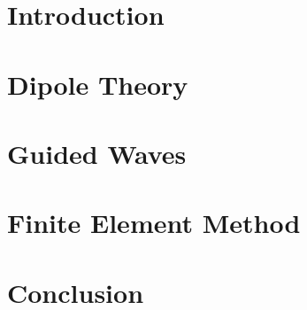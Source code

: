 \documentclass[11pt]{article}
\numberwithin{equation}{section}
\numberwithin{figure}{section}
\numberwithin{table}{section}
\begin{document}
\noindent

\cleardoublepage
\fi

	\tableofcontents  

\newpage
	\listoffigures 

\newpage
	\listoftables
	
\cleardoublepage

\pagestyle{headings}

\section{Introduction}


\section{Dipole Theory}\label{sec:dipole-theory}



\section{Guided Waves}\label{sec:guided-waves}






\section{Finite Element Method}\label{sec:simulations}









\newpage

\section{Conclusion}\label{sec:conclusions}


\cleardoublepage
\printbibliography
\end{document}
